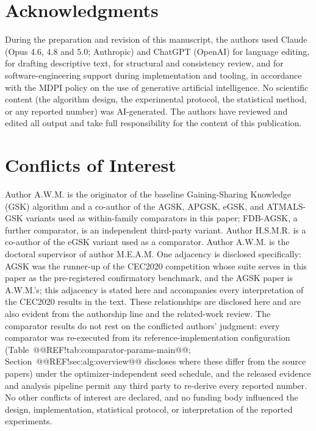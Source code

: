 \documentclass[10pt,a4paper]{article}
\begin{document}
\section*{Acknowledgments}

During the preparation and revision of this manuscript, the
authors used Claude (Opus 4.6, 4.8 and 5.0; Anthropic) and ChatGPT (OpenAI) for
language editing, for drafting descriptive text, for structural and consistency
review, and for software-engineering support during implementation
and tooling, in accordance with the MDPI policy on the use of
generative artificial intelligence. No scientific content (the
algorithm design, the experimental protocol, the statistical method, or any
reported number) was AI-generated. The authors have reviewed and
edited all output and take full responsibility for the content of this
publication.








\section*{Conflicts of Interest}

Author A.W.M. is the originator of the baseline
Gaining-Sharing Knowledge (GSK) algorithm and a co-author of the
AGSK, APGSK, eGSK, and ATMALS-GSK variants used as within-family
comparators in this paper; FDB-AGSK, a further comparator, is an
independent third-party variant.  Author H.S.M.R. is a co-author of
the eGSK variant used as a comparator.  Author A.W.M. is the doctoral
supervisor of author M.E.A.M.  One adjacency is disclosed specifically:
AGSK was the runner-up of the CEC2020 competition whose suite serves in
this paper as the pre-registered confirmatory benchmark, and the AGSK
paper is A.W.M.'s; this adjacency is stated here and accompanies every
interpretation of the CEC2020 results in the text.  These
relationships are disclosed here and are also evident from the
authorship line and the related-work review.  The comparator
results do not rest on the conflicted authors' judgment: every
comparator was re-executed from its reference-implementation
configuration (Table~@@REF!tab:comparator-params-main@@;
Section~@@REF!sec:alg:overview@@ discloses where these differ from the
source papers) under the
optimizer-independent seed schedule, and the released evidence and
analysis pipeline permit any third party to re-derive every reported
number.  No other conflicts of interest are
declared, and no funding body influenced the design, implementation,
statistical protocol, or interpretation of the reported experiments.
\end{document}
